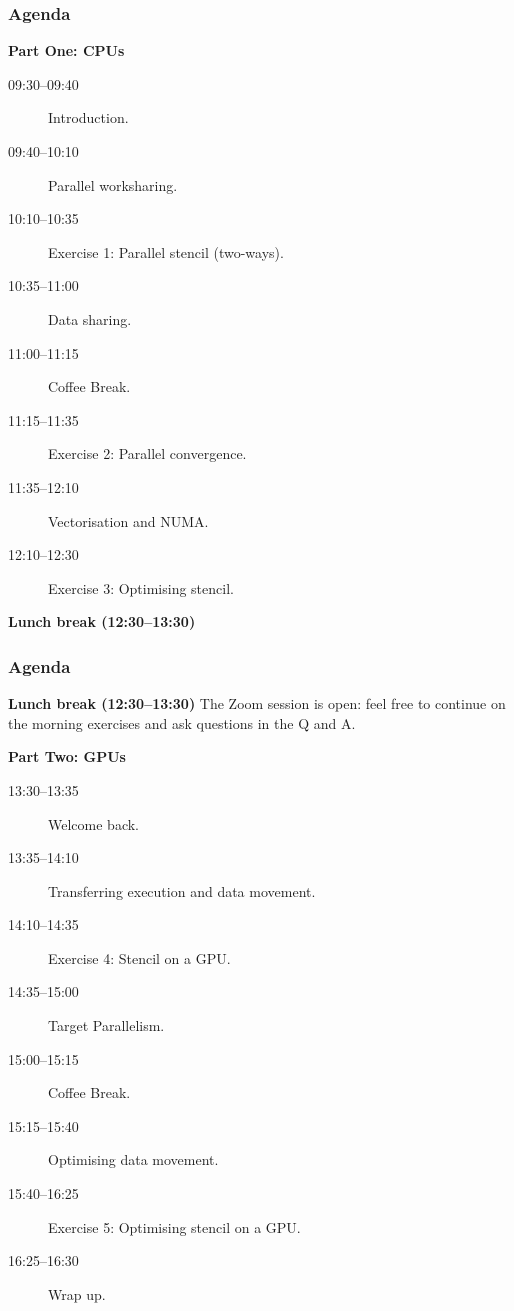 \documentclass[aspectratio=169]{beamer}
\begin{document}


\begin{frame}
\frametitle{Agenda}

\textbf{Part One: CPUs}
\begin{description}
  \item[09:30--09:40] Introduction.
  \item[09:40--10:10] Parallel worksharing.
  \item[10:10--10:35] Exercise 1: Parallel stencil (two-ways).
  \item[10:35--11:00] Data sharing.
  \item[11:00--11:15] Coffee Break.
  \item[11:15--11:35] Exercise 2: Parallel convergence.
  \item[11:35--12:10] Vectorisation and NUMA.
  \item[12:10--12:30] Exercise 3: Optimising stencil.
\end{description}

\textbf{Lunch break (12:30--13:30)}
\end{frame}

\begin{frame}
\frametitle{Agenda}
\textbf{Lunch break (12:30--13:30)}
The Zoom session is open: feel free to continue on the morning exercises and ask questions in the Q and A.

\textbf{Part Two: GPUs}
\begin{description}
  \item[13:30--13:35] Welcome back.
  \item[13:35--14:10] Transferring execution and data movement.
  \item[14:10--14:35] Exercise 4: Stencil on a GPU.
  \item[14:35--15:00] Target Parallelism.
  \item[15:00--15:15] Coffee Break.
  \item[15:15--15:40] Optimising data movement.
  \item[15:40--16:25] Exercise 5: Optimising stencil on a GPU.
  \item[16:25--16:30] Wrap up.
\end{description}
\end{frame}


\end{document}
